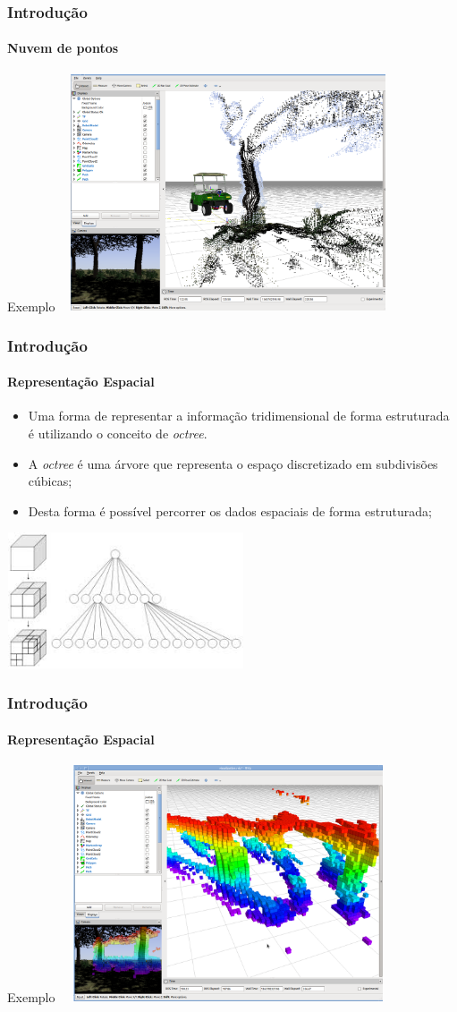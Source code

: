 \documentclass[brazil]{beamer}
\begin{document}
\begin{frame}
\frametitle{Introdução}
\framesubtitle{Nuvem de pontos}
Exemplo
\includegraphics[width=10cm,height=7cm,]{../img/point_cloud_4.png}
\end{frame}


\begin{frame}
\frametitle{Introdução}
\framesubtitle{Representação Espacial}
\begin{itemize}
  \item Uma forma de representar a informação tridimensional de forma
  estruturada é utilizando o conceito de \textit{octree}.
  \item A \textit{octree} é uma árvore que representa o espaço discretizado em
  subdivisões cúbicas;
  \item Desta forma é possível percorrer os dados espaciais de forma
  estruturada;
 \end{itemize}
\center\includegraphics[width=7cm,height=4cm,]{../img/octree.jpg}
\end{frame}

\begin{frame}
\frametitle{Introdução}
\framesubtitle{Representação Espacial}
Exemplo
\includegraphics[width=10cm,height=7cm,]{../img/octree_map_2.png}
\end{frame}
\end{document}

